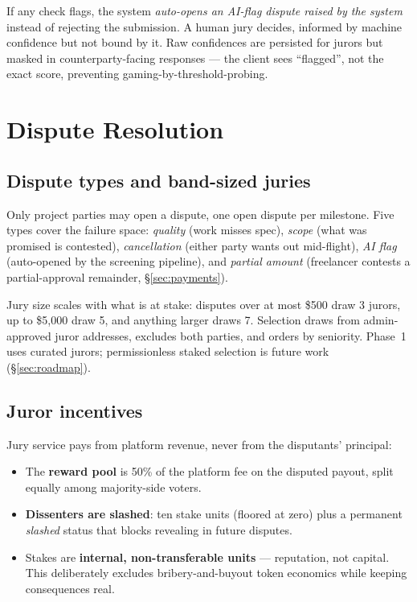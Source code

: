 \documentclass[11pt,letterpaper]{article}
\begin{document}
If any check flags, the system \emph{auto-opens an AI-flag dispute raised by the
system} instead of rejecting the submission. A human jury decides, informed by
machine confidence but not bound by it. Raw confidences are persisted for jurors but
masked in counterparty-facing responses --- the client sees ``flagged'', not the
exact score, preventing gaming-by-threshold-probing.

\section{Dispute Resolution}\label{sec:disputes}

\subsection{Dispute types and band-sized juries}

Only project parties may open a dispute, one open dispute per milestone. Five types
cover the failure space: \emph{quality} (work misses spec), \emph{scope} (what was
promised is contested), \emph{cancellation} (either party wants out mid-flight),
\emph{AI flag} (auto-opened by the screening pipeline), and \emph{partial amount}
(freelancer contests a partial-approval remainder, \S\ref{sec:payments}).

Jury size scales with what is at stake: disputes over at most \$500 draw 3 jurors, up
to \$5{,}000 draw 5, and anything larger draws 7. Selection draws from
admin-approved juror addresses, excludes both parties, and orders by seniority.
Phase~1 uses curated jurors; permissionless staked selection is future work
(\S\ref{sec:roadmap}).

\subsection{Juror incentives}

Jury service pays from platform revenue, never from the disputants' principal:

\begin{itemize}
\item The \textbf{reward pool} is 50\% of the platform fee on the disputed payout,
split equally among majority-side voters.
\item \textbf{Dissenters are slashed}: ten stake units (floored at zero) plus a
permanent \emph{slashed} status that blocks revealing in future disputes.
\item Stakes are \textbf{internal, non-transferable units} --- reputation, not
capital. This deliberately excludes bribery-and-buyout token economics while keeping
consequences real.
\end{itemize}
\end{document}
